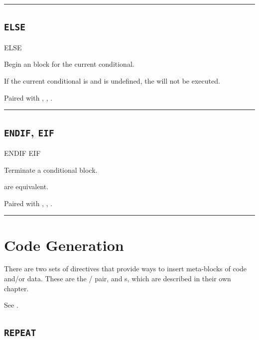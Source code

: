 \hrule

\subsection{\texttt{ELSE}}
\label{pseudoop:else}

\begin{usage}
  ELSE
\end{usage}

Begin an  block for the current conditional.

If the current conditional is  and  is undefined, the  will not be executed.

Paired with , , .\\


\hrule


\subsection{\texttt{ENDIF}, \texttt{EIF}}
\label{pseudoop:endif}
\label{pseudoop:eif}

\begin{usage}
  ENDIF
  EIF
\end{usage}

Terminate a conditional block.

 are equivalent.

Paired with , , .\\

\hrule


\section{Code Generation}

There are two sets of directives that provide ways to insert meta-blocks of code and/or data. These are the / pair, and s, which are described in their own chapter.

See .

\subsection{\texttt{REPEAT}}
\label{pseudoop:repeat}

